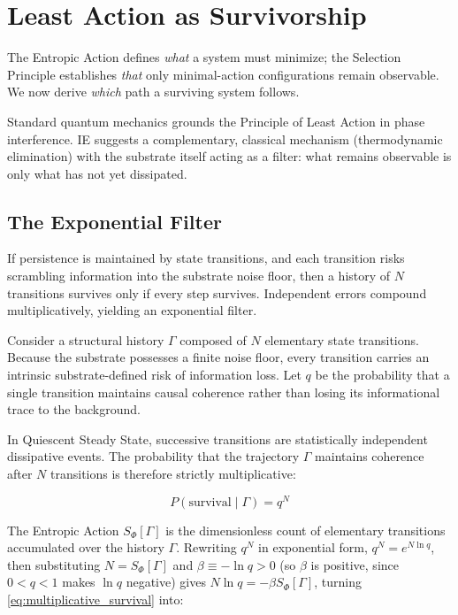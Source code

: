 \section{Least Action as Survivorship}
\label{sec:least_action}

The Entropic Action defines \textit{what} a system must minimize; the Selection Principle establishes \textit{that} only minimal-action configurations remain observable. We now derive \textit{which} path a
surviving system follows.

Standard quantum mechanics grounds the Principle of Least Action in phase interference. IE suggests a complementary, classical mechanism (thermodynamic elimination) with the substrate itself acting as
a filter: what remains observable is only what has not yet dissipated.

\subsection{The Exponential Filter}
\label{subsec:exponential_filter}

If persistence is maintained by state transitions, and each transition risks scrambling information into the substrate noise floor, then a history of $N$ transitions survives only if every step survives. Independent errors compound multiplicatively, yielding an exponential filter.

Consider a structural history $\Gamma$ composed of $N$ elementary state transitions. Because the substrate possesses a finite noise floor, every transition carries an intrinsic substrate-defined risk of information loss. Let $q$ be the probability that a single transition maintains causal coherence rather than losing its informational trace to the background.

In Quiescent Steady State, successive transitions are statistically independent dissipative events. The probability that the trajectory $\Gamma$ maintains coherence after $N$ transitions is therefore strictly multiplicative:

\begin{equation}
\label{eq:multiplicative_survival}
    P(\text{survival} \mid \Gamma) = q^N
\end{equation}

The Entropic Action $S_\Phi[\Gamma]$ is the dimensionless count of elementary transitions accumulated over the history $\Gamma$. Rewriting $q^N$ in exponential form, $q^N = e^{N\ln q}$, then substituting $N = S_\Phi[\Gamma]$ and $\beta \equiv -\ln q > 0$ (so $\beta$ is positive, since $0<q<1$ makes $\ln q$ negative) gives $N\ln q = -\beta S_\Phi[\Gamma]$, turning \cref{eq:multiplicative_survival} into:

